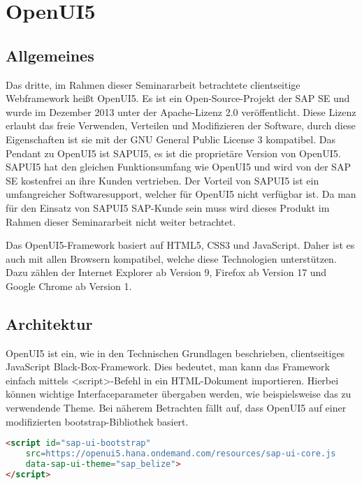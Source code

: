 
\chapter{OpenUI5}
\label{ch:openUI5}

\section{Allgemeines}

Das dritte, im Rahmen dieser Seminararbeit betrachtete clientseitige Webframework heißt OpenUI5. Es ist ein Open-Source-Projekt der SAP SE und wurde im Dezember 2013 unter der Apache-Lizenz 2.0 veröffentlicht. Diese Lizenz erlaubt das freie Verwenden, Verteilen und Modifizieren der Software, durch diese Eigenschaften ist sie mit der GNU General Public License 3 kompatibel. Das Pendant zu OpenUI5 ist SAPUI5, es ist die proprietäre Version von OpenUI5. SAPUI5 hat den gleichen Funktionsumfang wie OpenUI5 und wird von der SAP SE kostenfrei an ihre Kunden vertrieben. Der Vorteil von SAPUI5 ist ein umfangreicher Softwaresupport, welcher für OpenUI5 nicht verfügbar ist. Da man für den Einsatz von SAPUI5 SAP-Kunde sein muss wird dieses Produkt im Rahmen dieser Seminararbeit nicht weiter betrachtet.

Das OpenUI5-Framework basiert auf HTML5, CSS3 und JavaScript. Daher ist es auch mit allen Browsern kompatibel, welche diese Technologien unterstützen. Dazu zählen der Internet Explorer ab Version 9, Firefox ab Version 17 und Google Chrome ab Version 1.\autocites[vgl.][6]{SAP2013}


\section{Architektur}

OpenUI5 ist ein, wie in den Technischen Grundlagen beschrieben, clientseitiges JavaScript Black-Box-Framework. Dies bedeutet, man kann das Framework einfach mittels <script>-Befehl in ein HTML-Dokument importieren. Hierbei können wichtige Interfaceparameter übergaben werden, wie beispielsweise das zu verwendende Theme. Bei näherem Betrachten fällt auf, dass OpenUI5 auf einer modifizierten bootstrap-Bibliothek basiert. 

\begin{lstlisting}[caption=Beispiel für das Einbinden von OpenUI5, label=lst:UI5Einbinden, language=HTML]
<script id="sap-ui-bootstrap"
	src=https://openui5.hana.ondemand.com/resources/sap-ui-core.js
	data-sap-ui-theme="sap_belize">
</script>
\end{lstlisting}

